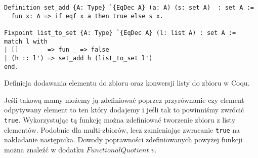 \begin{code}
\begin{verbatim}
Definition set_add {A: Type} `{EqDec A} (a: A) (s: set A)  : set A :=
  fun x: A => if eqf x a then true else s x.

Fixpoint list_to_set {A: Type} `{EqDec A} (l: list A) : set A :=
match l with
| []        => fun _ => false
| (h :: l') => set_add h (list_to_set l')
end.
\end{verbatim}
\caption{Definicja dodawania elementu do zbioru oraz konwersji listy do zbioru w Coqu.}
\label{set_union}
\end{code}
Jeśli takową mamy możemy ją zdefiniować poprzez przyrównanie czy element odpytywany element to ten który dodajemy i jeśli tak to powinniśmy zwrócić \texttt{true}. Wykorzystując tą funkcję można zdefiniować tworzenie zbioru z listy elementów. Podobnie dla multi-zbiorów, lecz zamieniając zwracanie \texttt{true} na nakładanie następnika. Dowody poprawności zdefiniowanych powyżej funkcji można znaleźć w dodatku $FunctionalQuotient.v$.
